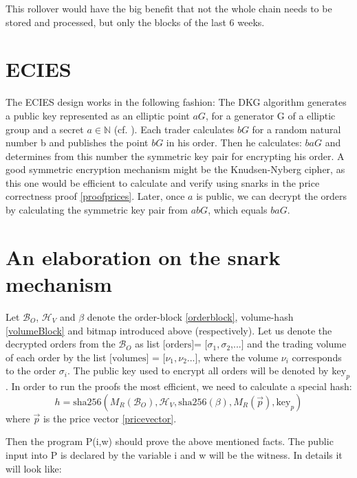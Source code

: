 \documentclass[11pt,parskip=full]{scrartcl}%
\begin{document}
This rollover would have the big benefit that not the whole chain needs to be stored and processed, but only the blocks of the last 6 weeks. 
\begin{appendices}
\section{ECIES}
\label{ECIES}
The ECIES design works in the following fashion:
The DKG algorithm generates a public key represented as an elliptic point $aG\label{public key}$, for a generator G of a elliptic group and a secret $a\in \mathbb{N}$ (cf. \cite{DKG}).  Each trader calculates $bG \label{salt}$ for a random natural number b and publishes the point $bG$  in his order. 
Then he calculates: $baG$ and determines from this number the symmetric key pair for encrypting his order. 
A good symmetric encryption mechanism might be the Knudsen-Nyberg cipher\cite{cipher}, as this one would be efficient to calculate and verify using snarks in the price correctness proof \ref{proofprices}.
Later, once $a$ is public, we can decrypt the orders by calculating the symmetric key pair from $abG$, which equals $baG$.

\section{An elaboration on the snark mechanism}
\label{snarkElaboration}
Let $\mathcal{B}_O$, $\mathcal{H}_V$ and $\beta$ denote the order-block \ref{orderblock}, volume-hash \ref{volumeBlock} and bitmap introduced above (respectively). 
Let us denote the decrypted orders from the $\mathcal{B}_O$ as list $\text{[orders]= [}\sigma_1, \sigma_2\text{,...]}$ and the trading volume of each order by the list $\text{[volumes] = [}\nu_1, \nu_2\text{...]}$, where the volume $\nu_i$ corresponds to the order $\sigma_i$. 
The public key used to encrypt all orders will be denoted by $\text{key}_p$.
In order to run the proofs the most efficient, we need to calculate a special hash:
\begin{equation}
h = \text{sha256}(M_R(\mathcal{B}_O),\mathcal{H}_V, \text{sha256}(\beta), M_R(\vec{p}), \text{key}_p) 
\end{equation}
where $\vec{p}$ is the price vector \ref{pricevector}.

Then the program P(i,w) should prove the above mentioned facts. 
The public input into P is declared by the variable i and w will be the witness. 
In details it will look like:


\end{appendices}
\end{document}
